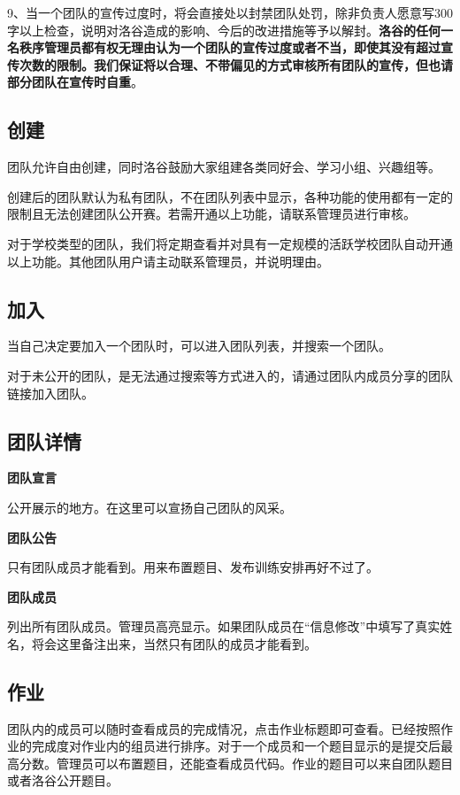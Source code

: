\documentclass[10pt,a4paper]{article}
\begin{document}
		
		9、当一个团队的宣传过度时，将会直接处以封禁团队处罚，除非负责人愿意写300字以上检查，说明对洛谷造成的影响、今后的改进措施等予以解封。\textbf{{洛谷的任何一名秩序管理员都有权无理由认为一个团队的宣传过度或者不当，即使其没有超过宣传次数的限制。我们保证将以合理、不带偏见的方式审核所有团队的宣传，但也请部分团队在宣传时自重}}。
		
		\subsection{
			创建}
		
		
		团队允许自由创建，同时洛谷鼓励大家组建各类同好会、学习小组、兴趣组等。
		
		
		创建后的团队默认为私有团队，不在团队列表中显示，各种功能的使用都有一定的限制且无法创建团队公开赛。若需开通以上功能，请联系管理员进行审核。
		
		
		对于学校类型的团队，我们将定期查看并对具有一定规模的活跃学校团队自动开通以上功能。其他团队用户请主动联系管理员，并说明理由。
		
		\subsection{
			加入}
		
		
		当自己决定要加入一个团队时，可以进入团队列表，并搜索一个团队。
		
		
		对于未公开的团队，是无法通过搜索等方式进入的，请通过团队内成员分享的团队链接加入团队。
		
		\subsection{
			团队详情}
		
		\textbf{{
				团队宣言}}
		
		
		公开展示的地方。在这里可以宣扬自己团队的风采。
		
		\textbf{{
				团队公告}}
		
		
		只有团队成员才能看到。用来布置题目、发布训练安排再好不过了。
		
		\textbf{{
				团队成员}}
		
		
		列出所有团队成员。管理员高亮显示。如果团队成员在“信息修改”中填写了真实姓名，将会这里备注出来，当然只有团队的成员才能看到。
		
		\subsection{
			作业}
		
		
		团队内的成员可以随时查看成员的完成情况，点击作业标题即可查看。已经按照作业的完成度对作业内的组员进行排序。对于一个成员和一个题目显示的是提交后最高分数。管理员可以布置题目，还能查看成员代码。作业的题目可以来自团队题目或者洛谷公开题目。
		
\end{document}
